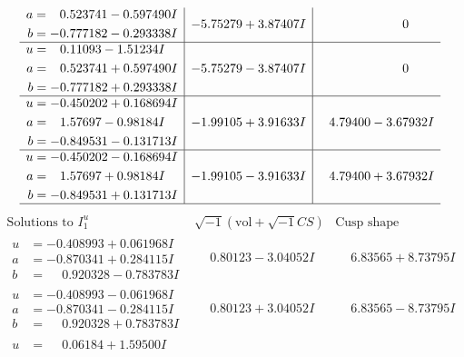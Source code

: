 \documentclass[1p]{elsarticle_modified}
\theoremstyle{definition}
\newcommand{\I}{\sqrt{-1}}
\begin{document}
$$\begin{array}{c|c|c}
\begin{aligned}
a &= \phantom{-}0.523741 - 0.597490 I \\
b &= -0.777182 - 0.293338 I\end{aligned}
 & -5.75279 + 3.87407 I & \phantom{-0.000000 } 0 \\ \hline\begin{aligned}
u &= \phantom{-}0.11093 - 1.51234 I \\
a &= \phantom{-}0.523741 + 0.597490 I \\
b &= -0.777182 + 0.293338 I\end{aligned}
 & -5.75279 - 3.87407 I & \phantom{-0.000000 } 0 \\ \hline\begin{aligned}
u &= -0.450202 + 0.168694 I \\
a &= \phantom{-}1.57697 - 0.98184 I \\
b &= -0.849531 - 0.131713 I\end{aligned}
 & -1.99105 + 3.91633 I & \phantom{-}4.79400 - 3.67932 I \\ \hline\begin{aligned}
u &= -0.450202 - 0.168694 I \\
a &= \phantom{-}1.57697 + 0.98184 I \\
b &= -0.849531 + 0.131713 I\end{aligned}
 & -1.99105 - 3.91633 I & \phantom{-}4.79400 + 3.67932 I\\
 \hline 
 \end{array}$$\newpage$$\begin{array}{c|c|c}  
\text{Solutions to }I^u_{1}& \I (\text{vol} + \sqrt{-1}CS) & \text{Cusp shape}\\
 \hline 
\begin{aligned}
u &= -0.408993 + 0.061968 I \\
a &= -0.870341 + 0.284115 I \\
b &= \phantom{-}0.920328 - 0.783783 I\end{aligned}
 & \phantom{-}0.80123 - 3.04052 I & \phantom{-}6.83565 + 8.73795 I \\ \hline\begin{aligned}
u &= -0.408993 - 0.061968 I \\
a &= -0.870341 - 0.284115 I \\
b &= \phantom{-}0.920328 + 0.783783 I\end{aligned}
 & \phantom{-}0.80123 + 3.04052 I & \phantom{-}6.83565 - 8.73795 I \\ \hline\begin{aligned}
u &= \phantom{-}0.06184 + 1.59500 I \\

\end{aligned}
\end{array}$$
\end{document}
